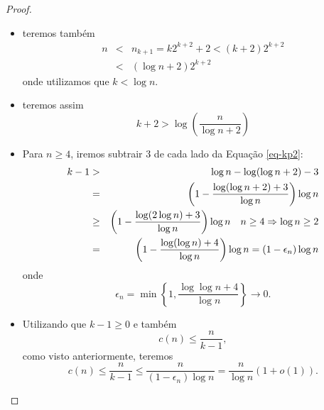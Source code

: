 \begin{frame}[allowframebreaks]
\begin{proof}
	\proofbreak

        \begin{itemize}
	\item teremos também
		\begin{eqnarray}
		n &<& n_{k+1} = k 2^{k+2} + 2 < (k+2) 2^{k+2} \nonumber \\
			&<& (\log n + 2) 2^{k+2} 
		\end{eqnarray}
		onde utilizamos que $k < \log n$.
	\item teremos assim
		\begin{equation}
		k+2 > \log \left( \frac{n}{\log n + 2} \right)
		\label{eq-kp2}
		\end{equation}
	\end{itemize}

	\proofbreak

        \begin{itemize}
        \item Para $n \geq 4$, iremos subtrair 3 de cada lado da Equação \ref{eq-kp2}:
	\vspace{-1em}
	\begin{eqnarray}
	k - 1 &>& \log n - \log( \log n + 2 ) - 3 \nonumber \\
		&=& \left( 1 - \frac{\log( \log n + 2 ) + 3}{\log n} \right) \log n \nonumber \\
		&\geq& \left( 1 - \frac{\log( 2 \log n ) + 3}{\log n} \right) \log n \quad {\small n \geq 4 \Rightarrow \log n \geq 2} \nonumber \\
		&=& \left( 1 - \frac{\log( \log n ) + 4}{\log n} \right) \log n = \left( 1 - \epsilon_n \right) \log n 
	\end{eqnarray}
	onde
	\vspace{-1em} 
	\begin{equation}
	\epsilon_n = \min \left\{ 1, \frac{\log \log n + 4}{\log n} \right\} \rightarrow 0 .
	\end{equation}
        \end{itemize}

	\proofbreak

        \begin{itemize}
        \item Utilizando que $k-1 \geq 0$ e também
		\begin{equation}
		c(n) \leq \frac{n}{k-1} ,
		\end{equation}
		como visto anteriormente, teremos 
		\begin{equation}
                c(n) \leq \frac{n}{k-1} \leq \frac{n}{(1 - \epsilon_n)\log n} = \frac{n}{\log n} \left( 1 + o(1) \right) .
		\end{equation}
	\end{itemize}
  \end{proof}
\end{frame}
